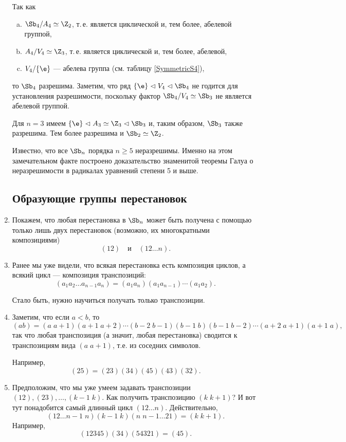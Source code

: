 \begin{enumerate}
Так как
\begin{enumerate}[a)]
\item $\Sb_4/A_4\simeq\Z_2$, т.\,е. является циклической и, тем более, абелевой группой,
\item $A_4/V_4\simeq\Z_3$, т.\,е. является циклической и, тем более, абелевой,
\item $V_4/\{\e\}$ --- абелева группа (см. таблицу \ref{SymmetricS4}),
\end{enumerate}
то $\Sb_4$ разрешима. Заметим, что ряд $\{\e\}\vartriangleleft V_4\vartriangleleft\Sb_4$ не годится для установления разрешимости, поскольку фактор $\Sb_4/V_4\simeq\Sb_3$ не является абелевой группой.

Для $n=3$ имеем $\{\e\}\vartriangleleft A_3\simeq\Z_3\vartriangleleft\Sb_3$ и, таким образом, $\Sb_3$ также разрешима. Тем более разрешима и $\Sb_2\simeq\Z_2$.

Известно, что все $\Sb_n$ порядка $n\ge 5$ неразрешимы. Именно на этом замечательном факте построено доказательство знаменитой теоремы Галуа о неразрешимости в радикалах уравнений степени 5 и выше.





\subsection*{Образующие группы перестановок}


\item Покажем, что любая перестановка в $\Sb_n$ может быть получена с помощью только лишь двух перестановок (возможно, их многократными композициями)
$$
(12)\quad\mbox{и}\quad(12\dots n).
$$
\item Ранее мы уже видели, что всякая перестановка есть композиция циклов, а всякий цикл --- композиция транспозиций:
\begin{equation}\label{transp}
(a_1a_2\dots a_{n-1}a_n) = (a_1a_n)(a_1a_{n-1})\cdots(a_1a_2).
\end{equation}

Стало быть, нужно научиться получать только транспозиции.
\item Заметим, что если $a<b$, то
$$
(ab)=(a\;a+1)(a+1\;a+2)\cdots(b-2\; b-1)(b-1\;b)(b-1\; b-2)\cdots(a+2\;a+1)(a+1\;a),
$$
так что любая транспозиция (а значит, любая перестановка) сводится к транспозициям вида $(a\;a+1)$, т.е. из соседних символов.

Например,
$$
(25) = (23)(34)(45)(43)(32).
$$
\item Предположим, что мы уже умеем задавать транспозиции $(12),(23),\dots,(k-1\;k)$. Как получить транспозицию $(k\;k+1)$? И вот тут понадобится самый длинный цикл $(12\dots n)$. Действительно,
$$
(12\dots n-1\; n)(k-1\;k)(n\;n-1\dots 21)=(k\;k+1).
$$
Например,
$$
(12345)(34)(54321)=(45).
$$


\end{enumerate}
